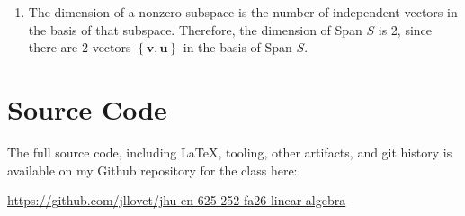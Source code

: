 \documentclass[10pt,letterpaper,final]{report}
\begin{document}
\begin{enumerate}[label=(\alph*)]
        Let the first two columns of $A$ be denoted by $\mathbf{v}= \begin{bmatrix} 1 \\ -1 \\ 0 \\ 1 \end{bmatrix}$ and $\mathbf{u} = \begin{bmatrix} -2 \\ 1 \\ 1 \\ 1 \end{bmatrix}$. Then $\left\{\mathbf{v}, \mathbf{u}\right\}$ forms a basis of $\text{Col } A$, or equivalently a basis of Span $S$.
  \item The dimension of a nonzero subspace is the number of independent vectors in the basis of that subspace. Therefore, the dimension of Span $S$ is 2, since there are 2 vectors $\left\{\mathbf{v}, \mathbf{u}\right\}$ in the basis of Span $S$.
\end{enumerate}

\pagebreak

\section*{Source Code}
The full source code, including LaTeX, tooling, other artifacts, and git history is available on my Github repository for the class here:
\begin{center}
  \url{https://github.com/jllovet/jhu-en-625-252-fa26-linear-algebra}
\end{center}

\printbibliography
\end{document}
